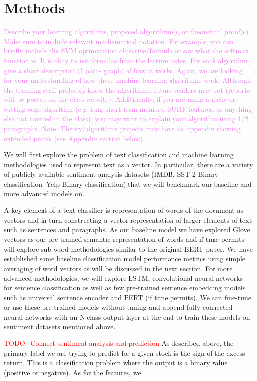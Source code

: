 \documentclass{article}
\newcommand{\instructions}[1]{\textcolor{violet}{{#1}}}
\newcommand{\TODO}[1]{\textcolor{red}{{TODO:~#1}}}
\begin{document}
\section{Methods}
\instructions{%
Describe your learning algorithms, proposed algorithm(s), or theoretical proof(s). Make sure to include relevant mathematical notation. For example, you can briefly include the SVM optimization objective/formula or say what the softmax function is. It is okay to use formulas from the lecture notes. For each algorithm, give a short description (\~ 1 para- graph) of how it works. Again, we are looking for your understanding of how these machine learning algorithms work. Although the teaching staff probably know the algorithms, future readers may not (reports will be posted on the class website). Additionally, if you are using a niche or cutting-edge algorithm (e.g. long short-term memory, SURF features, or anything else not covered in the class), you may want to explain your algorithm using 1/2 paragraphs. Note: Theory/algorithms projects may have an appendix showing extended proofs (see Appendix section below).
}

We will first explore the problem of text classification and machine learning methodologies used to represent text as a vector. In particular, there are a variety of publicly available sentiment analysis datasets (IMDB, SST-2 Binary classification, Yelp Binary classification) that we will benchmark our baseline and more advanced models on. 

A key element of a text classifier is representation of words of the document as vectors and in turn constructing a vector representation of larger elements of text such as sentences and paragraphs. As our baseline model we have explored Glove vectors as our pre-trained semantic representation of words and if time permits will explore sub-word methodologies similar to the original BERT paper. We have established some baseline classification model performance metrics using simple averaging of word vectors as will be discussed in the next section. For more advanced methodologies, we will explore LSTM, convolutional neural networks for sentence classification as well as few pre-trained sentence embedding models such as universal sentence encoder and BERT (if time permits). We can fine-tune or use these pre-trained models without tuning and append fully connected neural networks with an N-class output layer at the end to train these models on sentiment datasets mentioned above.

\TODO{Connect sentiment analysis and prediction} As described above, the primary label we are trying to predict for a given stock is the sign of the excess return.
This is a classification problem where the output is a binary value (positive or negative).
As for the features, we[]
\end{document}
